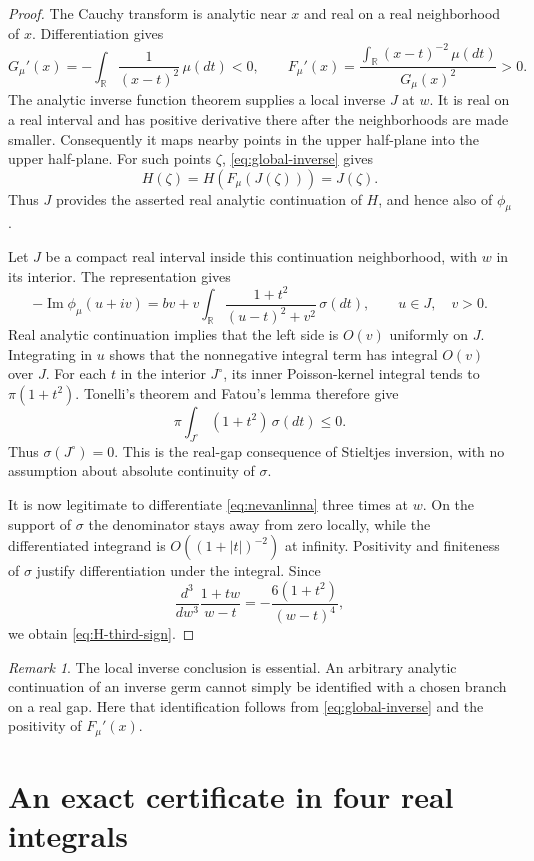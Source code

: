 \documentclass[11pt,a4paper]{article}
\theoremstyle{definition}
\theoremstyle{remark}
\newtheorem{remark}[theorem]{Remark}
\newcommand{\R}{\mathbb R}
\DeclareMathOperator{\Imn}{Im}
\begin{document}
\begin{proof}
The Cauchy transform is analytic near $x$ and real on a real
neighborhood of $x$. Differentiation gives
\[
 G_\mu'(x)=-\int_\R\frac{1}{(x-t)^2}\,\mu(dt)<0,
 \qquad
 F_\mu'(x)
 =\frac{\displaystyle\int_\R(x-t)^{-2}\,\mu(dt)}{G_\mu(x)^2}>0.
\]
The analytic inverse function theorem supplies a local inverse $J$
at $w$. It is real on a real interval and has positive derivative
there after the neighborhoods are made smaller. Consequently it
maps nearby points in the upper half-plane into the upper
half-plane. For such points $\zeta$, \eqref{eq:global-inverse} gives
\[
 H(\zeta)=H(F_\mu(J(\zeta)))=J(\zeta).
\]
Thus $J$ provides the asserted real analytic continuation of $H$,
and hence also of $\phi_\mu$.

Let $J$ be a compact real interval inside this continuation
neighborhood, with $w$ in its interior. The representation gives
\[
 -\Imn\phi_\mu(u+iv)
 =bv+v\int_\R\frac{1+t^2}{(u-t)^2+v^2}\,\sigma(dt),
 \qquad u\in J,\quad v>0.
\]
Real analytic continuation implies that the left side is $O(v)$
uniformly on $J$. Integrating in $u$ shows that the nonnegative
integral term has integral $O(v)$ over $J$. For each $t$ in the
interior $J^\circ$, its inner Poisson-kernel integral tends to
$\pi(1+t^2)$. Tonelli's theorem and Fatou's lemma therefore give
\[
 \pi\int_{J^\circ}(1+t^2)\,\sigma(dt)\le0.
\]
Thus $\sigma(J^\circ)=0$. This is the real-gap consequence of
Stieltjes inversion, with no assumption about absolute continuity
of $\sigma$.

It is now legitimate to differentiate \eqref{eq:nevanlinna} three
times at $w$. On the support of $\sigma$ the denominator stays away
from zero locally, while the differentiated integrand is
$O((1+|t|)^{-2})$ at infinity. Positivity and finiteness of $\sigma$
justify differentiation under the integral. Since
\[
 \frac{d^3}{dw^3}\frac{1+tw}{w-t}
 =-\frac{6(1+t^2)}{(w-t)^4},
\]
we obtain \eqref{eq:H-third-sign}.
\end{proof}

\begin{remark}
The local inverse conclusion is essential. An arbitrary analytic
continuation of an inverse germ cannot simply be identified with a
chosen branch on a real gap. Here that identification follows from
\eqref{eq:global-inverse} and the positivity of $F_\mu'(x)$.
\end{remark}

\section{An exact certificate in four real integrals}
\end{document}
